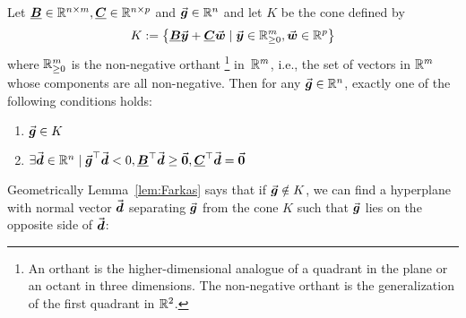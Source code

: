 \begin{lemma}[Farkas]\label{lem:Farkas}
  Let \( \underline{\boldsymbol{B}}\in\mathbb{R}^{n\times m}, \underline{\boldsymbol{C}}\in\mathbb{R}^{n\times p} \) and \( \vec{\boldsymbol{g}}\in\mathbb{R}^{n} \) and let \(K\) be the cone defined by
  \begin{equation}\label{eq:cone_K}
  K : = \left\{ \underline{\boldsymbol{B}} \vec{\boldsymbol{y}} + \underline{\boldsymbol{C}} \vec{\boldsymbol{w}} \mid \vec{\boldsymbol{y}} \in \mathbb{R}^m_{\ge 0}, \vec{\boldsymbol{w}}\in\mathbb{R}^{p} \right\} 
\end{equation}
  where \(\mathbb{R}^m_{\ge 0}\) is the non-negative orthant%
  \footnote{An orthant is the higher-dimensional analogue of a quadrant in the plane or an octant in three dimensions. The non-negative orthant is the generalization of the first quadrant in \(\mathbb{R}^2\).}
  in~\( \mathbb{R}^m \), i.e., the set of vectors in \(\mathbb{R}^m\) whose components are all non-negative.
  Then for any \(\vec{\boldsymbol{g}} \in \mathbb{R}^n\), exactly one of the following conditions holds:
  \begin{enumerate}[label=(\alph*)]
    \item \( \vec{\boldsymbol{g}} \in K \) \label{item:Farkas_in_K}
    \item \( \exists \vec{\boldsymbol{d}}\in\mathbb{R}^{n} \mid \vec{\boldsymbol{g}}^{\top} \vec{\boldsymbol{d}} < 0, \underline{\boldsymbol{B}}^{\top} \vec{\boldsymbol{d}} \ge \vec{\boldsymbol{0}}, \underline{\boldsymbol{C}}^{\top} \vec{\boldsymbol{d}} = \vec{\boldsymbol{0}} \) \qedhere\label{item:Farkas_hyperplane}
  \end{enumerate}
\end{lemma}
  Geometrically Lemma~\ref{lem:Farkas} says that if \(\vec{\boldsymbol{g}} \notin K\), we can find a hyperplane with normal vector \(\vec{\boldsymbol{d}}\) separating \(\vec{\boldsymbol{g}}\) from the cone \(K\) such that \(\vec{\boldsymbol{g}}\) lies on the opposite side of \(\vec{\boldsymbol{d}}\):

